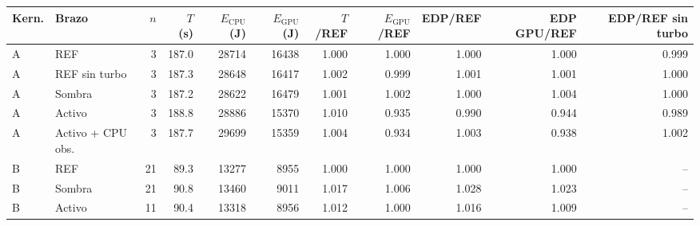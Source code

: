 \begin{tabular}{@{}llrrrrrrrrr@{}}
\toprule
\textbf{Kern.} & \textbf{Brazo} & \textbf{$n$} & \textbf{$T$ (s)} & \textbf{$E_{\mathrm{CPU}}$ (J)} & \textbf{$E_{\mathrm{GPU}}$ (J)} & \textbf{$T$/REF} & \textbf{$E_{\mathrm{GPU}}$/REF} & \textbf{EDP/REF} & \textbf{EDP GPU/REF} & \textbf{EDP/REF sin turbo} \\
\midrule
A & REF & 3 & 187.0 & 28714 & 16438 & 1.000 & 1.000 & 1.000 & 1.000 & 0.999 \\
A & REF sin turbo & 3 & 187.3 & 28648 & 16417 & 1.002 & 0.999 & 1.001 & 1.001 & 1.000 \\
A & Sombra & 3 & 187.2 & 28622 & 16479 & 1.001 & 1.002 & 1.000 & 1.004 & 1.000 \\
A & Activo & 3 & 188.8 & 28886 & 15370 & 1.010 & 0.935 & 0.990 & 0.944 & 0.989 \\
A & Activo + CPU obs. & 3 & 187.7 & 29699 & 15359 & 1.004 & 0.934 & 1.003 & 0.938 & 1.002 \\
\midrule
B & REF & 21 & 89.3 & 13277 & 8955 & 1.000 & 1.000 & 1.000 & 1.000 & -- \\
B & Sombra & 21 & 90.8 & 13460 & 9011 & 1.017 & 1.006 & 1.028 & 1.023 & -- \\
B & Activo & 11 & 90.4 & 13318 & 8956 & 1.012 & 1.000 & 1.016 & 1.009 & -- \\
\bottomrule
\end{tabular}
